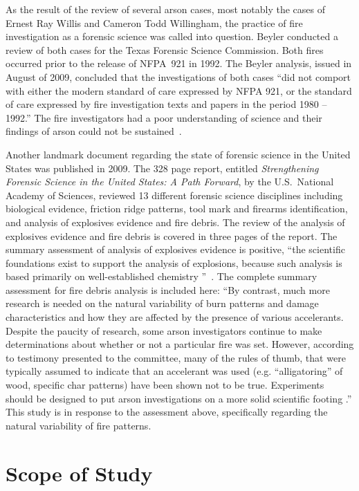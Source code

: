 \documentclass[twoside]{uocthesis}
\begin{document}
As the result of the review of several arson cases, most notably the cases of Ernest Ray Willis and Cameron Todd Willingham, the practice of fire investigation as a forensic science was called into question.  Beyler conducted a review of both cases for the Texas Forensic Science Commission.  Both fires occurred prior to the release of NFPA~921 in 1992.  The Beyler analysis, issued in August of 2009, concluded that the investigations of both cases ``did not comport with either the modern standard of care expressed by NFPA 921, or the standard of care expressed by fire investigation texts and papers in the period 1980 – 1992.'' The fire investigators had a poor understanding of science and their findings of arson could not be sustained~\cite{Beyler:2009}.

Another landmark document regarding the state of forensic science in the United States was published in 2009.  The 328 page report, entitled {\em Strengthening Forensic Science in the United States: A Path Forward}, by the U.S.~National Academy of Sciences, reviewed 13 different forensic science disciplines including biological evidence, friction ridge patterns, tool mark and firearms identification, and analysis of explosives evidence and fire debris.  The review of the analysis of explosives evidence and fire debris is covered in three pages of the report.  The summary assessment of analysis of explosives evidence is positive, ``the scientific foundations exist to support the analysis of explosions, because such analysis is based primarily on well-established chemistry ''~\cite{Forensic:2009}.  The complete summary assessment for fire debris analysis is included here: ``By contrast, much more research is needed on the natural variability of burn patterns and damage characteristics and how they are affected by the presence of various accelerants.  Despite the paucity of research, some arson investigators continue to make determinations about whether or not a particular fire was set.  However, according to testimony presented to the committee, many of the rules of thumb, that were typically assumed to indicate that an accelerant was used (e.g. ``alligatoring'' of wood, specific char patterns) have been shown not to be true.  Experiments should be designed to put arson investigations on a more solid scientific footing .''
This study is in response to the assessment above, specifically regarding the natural variability of fire patterns.


\chapter{Scope of Study}
\label{chapter:Scope of Study}
\end{document}
